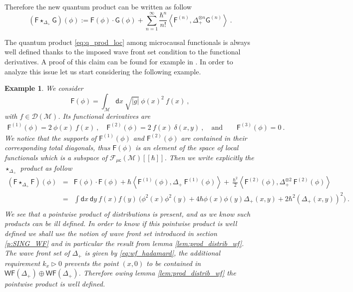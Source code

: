 \documentclass[11pt]{book}
\newcommand{\WF}{\mathsf{WF}}
\newcommand{\muc}{\mu\csf}
\newcommand{\abs}[1]{\left|#1\right|}
\newcommand{\sm}[1]{\left\langle#1\right\rangle}
\newcommand{\Dcal}{\mathcal{D}}
\newcommand{\Fcal}{\mathcal{F}}
\newcommand{\Mcal}{\mathcal{M}}
\newcommand{\Fsf}{\mathsf{F}}
\newcommand{\Gsf}{\mathsf{G}}
\newcommand{\csf}{\mathsf{c}}
\newcommand{\dsf}{\mathsf{d}}
\theoremstyle{break}
\newtheorem{example}{Example}[chapter]
\begin{document}
Therefore the new quantum product can be written as follow 
%
\begin{equation}
(\Fsf \star_{\Delta_+} \Gsf)(\phi) := \Fsf(\phi) \cdot \Gsf(\phi) + \sum_{n=1}^\infty \frac{\hbar^n}{n!} \sm{ \Fsf^{(n)} , \Delta_+^{\otimes n} \Gsf^{(n) } } \ .
\label{eq:q_prod_loc}
\end{equation}


The quantum product \eqref{eq:q_prod_loc} among microcausal functionals is always well defined thanks to the imposed wave front set condition to the functional derivatives. A proof of this claim can be found for example in \cite{HW_2003}. In order to analyze this issue let us start considering the following example.


\begin{example}
We consider 
%
\begin{equation}
\Fsf(\phi) = \int_\Mcal \dsf x \ \sqrt{\abs{g}} \ \phi(x)^2 \ f(x)  \ ,
\label{eq:exo_loc_obs}
\end{equation}
%
with $f \in \Dcal(\Mcal)$. Its functional derivatives are
%
\begin{eqnarray*}
\Fsf^{(1)}(\phi) = 2 \ \phi(x) \ f(x) \ , \quad \Fsf^{(2)}(\phi) = 2 \ f(x) \ \delta(x,y) \ , \quad \mbox{and} \qquad \Fsf^{(3)}(\phi) = 0 \ .
\end{eqnarray*}
%
We notice that the supports of $\Fsf^{(1)}(\phi)$ and $\Fsf^{(2)}(\phi)$ are contained in their corresponding total diagonals, thus $\Fsf(\phi)$ is an element of the space of local functionals which is a subspace of $\Fcal_{\muc}(\Mcal)[[\hbar]]$. 
%
Then we write explicitly the $\star_{\Delta_+}$ product as follow
%
\begin{eqnarray}
(\Fsf \star_{\Delta_+} \Fsf)(\phi) &=& \Fsf(\phi) \cdot \Fsf(\phi) + \hbar \sm{ \Fsf^{(1)}(\phi) , \Delta_+ \ \Fsf^{(1)}(\phi) } + \ \frac{\hbar^2}{2} \sm{ \Fsf^{(2)}(\phi) , \Delta_+^{\otimes 2} \ \Fsf^{(2)}(\phi)} \nonumber \\
%
&=& \int \dsf x \ \dsf y \ f(x) f(y) \ \bigg( \phi^2(x) \phi^2(y) + 4 \hbar \phi(x) \phi(y) \Delta_+(x,y) + 2 \hbar^2 \left(\Delta_+(x,y)\right)^2 \bigg) \ . \nonumber \\
\label{eq:exo_loc_obs_prod_q}
\end{eqnarray}
%
We see that a pointwise product of distributions is present, and as we know such products can be ill defined. In order to know if this pointwise product is well defined we shall use the notion of wave front set introduced in section \ref{p:SING_WF} and in particular the result from lemma \ref{lem:prod_distrib_wf}. The wave front set of $\Delta_+$ is given by \eqref{eq:wf_hadamard}, the additional requirement $k_x \triangleright 0$ prevents the point $(x,0)$ to be contained in $\WF(\Delta_+) \oplus \WF(\Delta_+)$. Therefore owing lemma \ref{lem:prod_distrib_wf} the pointwise product is well defined.
\end{example}
\end{document}
